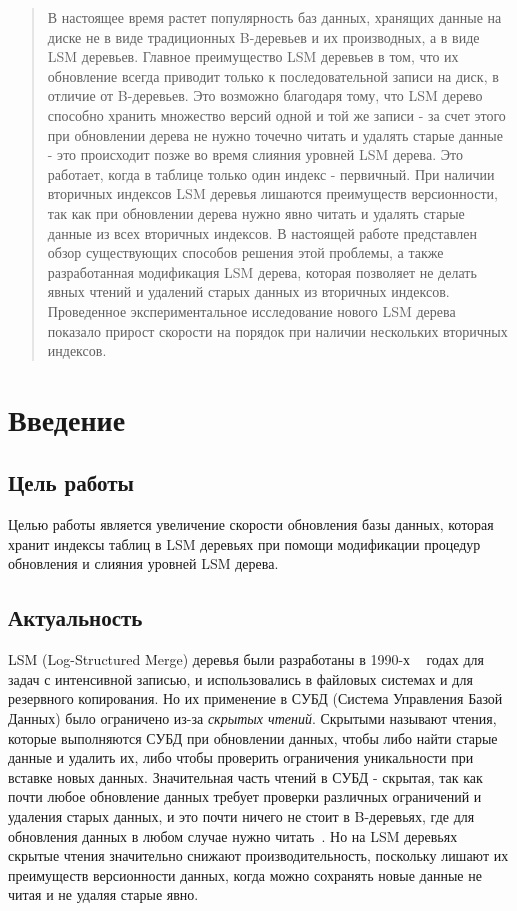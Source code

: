 \documentclass[a4paper,hidelinks,12pt]{article}
\begin{document}
\setcounter{page}{2}
\onehalfspacing

\begin{abstract}

В настоящее время растет популярность баз данных, хранящих данные на диске не в
виде традиционных B-деревьев и их производных, а в виде LSM деревьев. Главное
преимущество LSM деревьев в том, что их обновление всегда приводит только к
последовательной записи на диск, в отличие от B-деревьев. Это возможно благодаря
тому, что LSM дерево способно хранить множество версий одной и той же записи -
за счет этого при обновлении дерева не нужно точечно читать и удалять старые
данные - это происходит позже во время слияния уровней LSM дерева. Это работает,
когда в таблице только один индекс - первичный. При наличии вторичных индексов
LSM деревья лишаются преимуществ версионности, так как при обновлении дерева
нужно явно читать и удалять старые данные из всех вторичных индексов. В
настоящей работе представлен обзор существующих способов решения этой проблемы,
а также разработанная модификация LSM дерева, которая позволяет не делать явных
чтений и удалений старых данных из вторичных индексов. Проведенное
экспериментальное исследование нового LSM дерева показало прирост скорости на
порядок при наличии нескольких вторичных индексов.

\end{abstract}

\newpage
\tableofcontents

\newpage
\section{Введение}

\subsection{Цель работы}
Целью работы является увеличение скорости обновления базы данных, которая
хранит индексы таблиц в LSM деревьях при помощи модификации процедур обновления
и слияния уровней LSM дерева.

\subsection{Актуальность}
LSM (Log-Structured Merge) деревья были разработаны в 1990-х ~\cite{lsm-intro}
годах для задач с интенсивной записью, и использовались в файловых системах и
для резервного копирования. Но их применение в СУБД (Система Управления Базой
Данных) было ограничено из-за \textit {скрытых чтений}. Скрытыми называют
чтения, которые выполняются СУБД при обновлении данных, чтобы либо найти старые
данные и удалить их, либо чтобы проверить ограничения уникальности при вставке
новых данных. Значительная часть чтений в СУБД - скрытая, так как почти любое
обновление данных требует проверки различных ограничений и удаления старых
данных, и это почти ничего не стоит в B-деревьях, где для обновления данных в
любом случае нужно читать~\cite{btree-intro}. Но на LSM деревьях скрытые чтения
значительно снижают производительность, поскольку лишают их преимуществ
версионности данных, когда можно сохранять новые данные не читая и не удаляя
старые явно.
\end{document}
